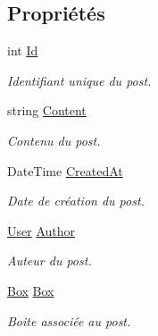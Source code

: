 \subsection*{Propriétés}
\begin{DoxyCompactItemize}
\item 
int \hyperlink{class_boxes_1_1_models_1_1_post_ab0676174d7c3c1857357323f25e5a670}{Id}
\begin{DoxyCompactList}\small\item\em Identifiant unique du post. \end{DoxyCompactList}\item 
string \hyperlink{class_boxes_1_1_models_1_1_post_ad19bad744f2fbfb06a350786d743612c}{Content}
\begin{DoxyCompactList}\small\item\em Contenu du post. \end{DoxyCompactList}\item 
Date\+Time \hyperlink{class_boxes_1_1_models_1_1_post_ac0000703bb1d9bfeb5aeab59038529ab}{Created\+At}
\begin{DoxyCompactList}\small\item\em Date de création du post. \end{DoxyCompactList}\item 
\hyperlink{class_boxes_1_1_models_1_1_user}{User} \hyperlink{class_boxes_1_1_models_1_1_post_a9a761c3ae677e43965d50b54221a05c2}{Author}
\begin{DoxyCompactList}\small\item\em Auteur du post. \end{DoxyCompactList}\item 
\hyperlink{class_boxes_1_1_models_1_1_box}{Box} \hyperlink{class_boxes_1_1_models_1_1_post_aeebf5eb456aa4537f3faf9ea1fb4bdda}{Box}
\begin{DoxyCompactList}\small\item\em Boite associée au post. \end{DoxyCompactList}\end{DoxyCompactItemize}


